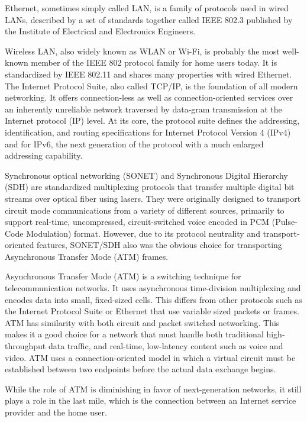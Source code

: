 \documentclass[a4paper]{article}
\begin{document}
\begin{enumerate}[label={\textbf{\Roman*.}},leftmargin=0pt,itemindent=*]
    Ethernet, sometimes simply called LAN, is a family of protocols used in
    wired LANs, described by a set of standards together called IEEE 802.3
    published by the Institute of Electrical and Electronics Engineers.

    Wireless LAN, also widely known as WLAN or Wi-Fi, is probably the most
    well-known member of the IEEE 802 protocol family for home users today. It
    is standardized by IEEE 802.11 and shares many properties with wired
    Ethernet. The Internet Protocol Suite, also called TCP/IP, is the foundation
    of all modern networking. It offers connection-less as well as
    connection-oriented services over an inherently unreliable network traversed
    by data-gram transmission at the Internet protocol (IP) level. At its core,
    the protocol suite defines the addressing, identification, and routing
    specifications for Internet Protocol Version 4 (IPv4) and for IPv6, the next
    generation of the protocol with a much enlarged addressing capability.

    Synchronous optical networking (SONET) and Synchronous Digital Hierarchy
    (SDH) are standardized multiplexing protocols that transfer multiple digital
    bit streams over optical fiber using lasers. They were originally designed
    to transport circuit mode communications from a variety of different
    sources, primarily to support real-time, uncompressed, circuit-switched voice
    encoded in PCM (Pulse-Code Modulation) format. However, due to its protocol
    neutrality and transport-oriented features, SONET/SDH also was the obvious
    choice for transporting Asynchronous Transfer Mode (ATM) frames.

    Asynchronous Transfer Mode (ATM) is a switching technique for
    telecommunication networks. It uses asynchronous time-division multiplexing
    and encodes data into small, fixed-sized cells. This differs from other
    protocols such as the Internet Protocol Suite or Ethernet that use variable
    sized packets or frames. ATM has similarity with both circuit and packet
    switched networking. This makes it a good choice for a network that must
    handle both traditional high-throughput data traffic, and real-time,
    low-latency content such as voice and video. ATM uses a connection-oriented
    model in which a virtual circuit must be established between two endpoints
    before the actual data exchange begins.

    While the role of ATM is diminishing in favor of next-generation networks,
    it still plays a role in the last mile, which is the connection between an
    Internet service provider and the home user.


\end{enumerate}
\end{document}
